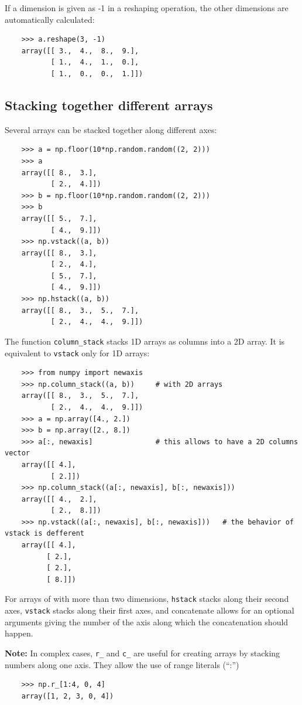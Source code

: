 \documentclass[UTF8]{article}
\begin{document}
If a dimension is given as -1 in a reshaping operation, the other dimensions are automatically
calculated:
\begin{verbatim}
    >>> a.reshape(3, -1)
    array([[ 3.,  4.,  8.,  9.],
           [ 1.,  4.,  1.,  0.],
           [ 1.,  0.,  0.,  1.]])
\end{verbatim}

\subsection{Stacking together different arrays}
Several arrays can be stacked together along different axes:
\begin{verbatim}
    >>> a = np.floor(10*np.random.random((2, 2)))
    >>> a
    array([[ 8.,  3.],
           [ 2.,  4.]])
    >>> b = np.floor(10*np.random.random((2, 2)))
    >>> b
    array([[ 5.,  7.],
           [ 4.,  9.]])
    >>> np.vstack((a, b))
    array([[ 8.,  3.],
           [ 2.,  4.],
           [ 5.,  7.],
           [ 4.,  9.]])
    >>> np.hstack((a, b))
    array([[ 8.,  3.,  5.,  7.],
           [ 2.,  4.,  4.,  9.]])
\end{verbatim}

The function \texttt{column\_stack} stacks 1D arrays as columns into a 2D array. It is equivalent
to \texttt{vstack} only for 1D arrays:
\begin{verbatim}
    >>> from numpy import newaxis
    >>> np.column_stack((a, b))     # with 2D arrays
    array([[ 8.,  3.,  5.,  7.],
           [ 2.,  4.,  4.,  9.]])
    >>> a = np.array([4., 2.])
    >>> b = np.array([2., 8.])
    >>> a[:, newaxis]               # this allows to have a 2D columns vector
    array([[ 4.],
           [ 2.]])
    >>> np.column_stack((a[:, newaxis], b[:, newaxis]))
    array([[ 4.,  2.],
           [ 2.,  8.]])
    >>> np.vstack((a[:, newaxis], b[:, newaxis]))   # the behavior of vstack is defferent
    array([[ 4.],
          [ 2.],
          [ 2.],
          [ 8.]])
\end{verbatim}

For arrays of with more than two dimensions, \texttt{hstack} stacks along their second axes,
\texttt{vstack} stacks along their first axes, and concatenate allows for an optional arguments
giving the number of the axis along which the concatenation should happen.

\textbf{Note:} In complex cases, \texttt{r\_} and \texttt{c\_} are useful for creating arrays by
stacking numbers along one axis. They allow the use of range literals (``:'')
\begin{verbatim}
    >>> np.r_[1:4, 0, 4]
    array([1, 2, 3, 0, 4])
\end{verbatim}
\end{document}
